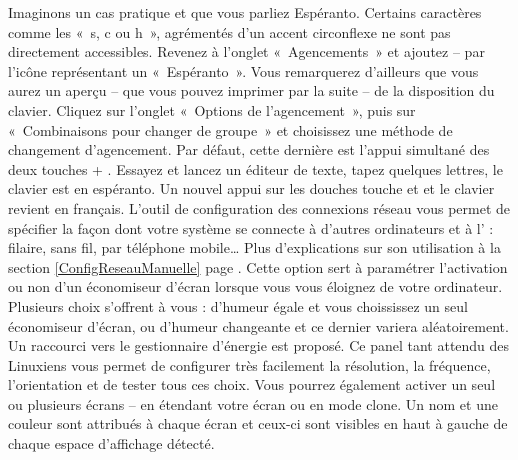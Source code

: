 Imaginons un cas pratique et que vous parliez Espéranto. Certains caractères comme les «~s, c ou h~», agrémentés d'un accent circonflexe ne sont pas directement accessibles. Revenez à l'onglet «~Agencements~» et ajoutez -- par l'icône représentant un \Touche{+} «~Espéranto~». Vous remarquerez d'ailleurs que vous aurez un aperçu -- que vous pouvez imprimer par la suite -- de la disposition du clavier. Cliquez sur l'onglet «~Options de l'agencement~», puis sur «~Combinaisons pour changer de groupe~» et choisissez une méthode de changement d'agencement. Par défaut, cette dernière est l'appui simultané des deux touches  + . Essayez et lancez un éditeur de texte, tapez quelques lettres, le clavier est en espéranto. Un nouvel appui sur les douches touche  et  et le clavier revient en français.
L'outil de configuration des connexions réseau vous permet de spécifier la façon dont votre système se connecte à d'autres ordinateurs et à l' : filaire, sans fil, par téléphone mobile\ldots{} Plus d'explications sur son utilisation à la section \ref{ConfigReseauManuelle} page \pageref{ConfigReseauManuelle}.
Cette option sert à paramétrer l'activation ou non d'un économiseur d'écran lorsque vous vous éloignez de votre ordinateur. Plusieurs choix s'offrent à vous : d'humeur égale et vous choississez un seul économiseur d’écran, ou d'humeur changeante et ce dernier variera aléatoirement. Un raccourci vers le gestionnaire d'énergie est proposé.
Ce panel tant attendu des Linuxiens vous permet de configurer très facilement la résolution, la fréquence, l'orientation et de tester tous ces choix. Vous pourrez également activer un seul ou plusieurs écrans -- en étendant votre écran ou en mode clone. Un nom et une couleur sont attribués à chaque écran et ceux-ci sont visibles en haut à gauche de chaque espace d'affichage détecté.
